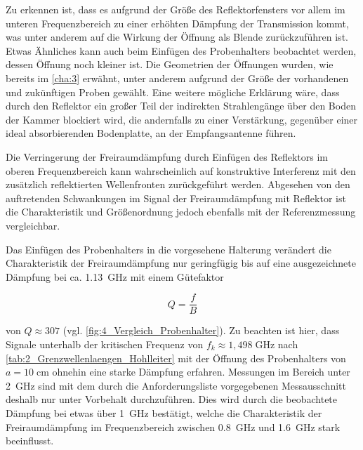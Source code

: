 Zu erkennen ist, dass es aufgrund der Größe des Reflektorfensters vor allem im unteren Frequenzbereich zu einer erhöhten Dämpfung der Transmission kommt, was unter anderem auf die Wirkung der Öffnung als Blende zurückzuführen ist. Etwas Ähnliches kann auch beim Einfügen des Probenhalters beobachtet werden, dessen Öffnung noch kleiner ist. Die Geometrien der Öffnungen wurden, wie bereits im \Kapitel\ref{cha:3} erwähnt, unter anderem aufgrund der Größe der vorhandenen und zukünftigen Proben gewählt. Eine weitere mögliche Erklärung wäre, dass durch den Reflektor ein großer Teil der indirekten Strahlengänge über den Boden der Kammer blockiert wird, die andernfalls zu einer Verstärkung, gegenüber einer ideal absorbierenden Bodenplatte, an der Empfangsantenne führen. 
\par
\vspace{\linespace}
Die Verringerung der Freiraumdämpfung durch Einfügen des Reflektors im oberen Frequenzbereich kann wahrscheinlich auf konstruktive Interferenz mit den zusätzlich reflektierten Wellenfronten zurück\-geführt werden. Abgesehen von den auftretenden Schwankungen im Signal der Freiraum\-dämpfung mit Reflektor ist die Charakteristik und Größenordnung jedoch ebenfalls mit der Referenzmessung vergleichbar.
\par
\vspace{\linespace}
Das Einfügen des Probenhalters in die vorgesehene Halterung verändert die Charakteristik der Freiraumdämpfung nur geringfügig bis auf eine ausgezeichnete Dämpfung bei ca. \SI{1,13}{\giga\hertz} mit einem Gütefaktor

\begin{equation}
    Q = \frac{f}{B}
\end{equation}

von $Q \approx 307$ (vgl. \Abb\ref{fig:4_Vergleich_Probenhalter}). Zu beachten ist hier, dass Signale unterhalb der kritischen Frequenz von $f_k \approx 1,498\;\si{\giga\hertz}$ nach \Tabelle\ref{tab:2_Grenzwellenlaengen_Hohlleiter} mit der Öffnung des Probenhalters von $a = 10\;\si{\centi\meter}$ ohnehin eine starke Dämpfung erfahren. Messungen im Bereich unter \SI{2}{\giga\hertz} sind mit dem durch die Anforderungsliste vorgegebenen Messausschnitt deshalb nur unter Vorbehalt durchzuführen. Dies wird durch die beobachtete Dämpfung bei etwas über \SI{1}{\giga\hertz} bestätigt, welche die Charakteristik der Freiraumdämpfung im Frequenzbereich zwischen \SI{0.8}{\giga\hertz} und \SI{1.6}{\giga\hertz} stark beeinflusst. %
\par
\vspace{\linespace}

